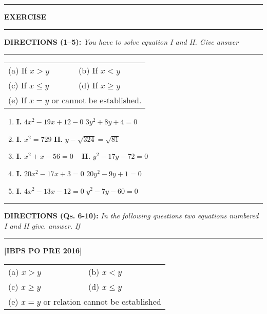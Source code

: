 \begin{multicols}{2}

\noindent
\rule{\columnwidth}{1pt}

\centerline{{\large\sf\bfseries EXERCISE}}

\noindent
\rule{\columnwidth}{1pt}

\noindent
{\sf\bfseries DIRECTIONS (1--5):} {\it You have to solve equation I and II. Give answer}

\noindent
\rule{\columnwidth}{1pt}

\begin{tabular}{l@{\qquad\quad}l}
(a) If $x > y$ & (b) If $x < y$\\ 
(c) If $x \leq y$ & (d) If $x \geq y$\\ 
\multicolumn{2}{l}{(e) If $x = y$ or cannot be established.}
\end{tabular}

\begin{enumerate}[leftmargin=*]
\item {\bf I.} $4x^2 - 19x + 12 - 0$   $3y^2 + 8y + 4 = 0$

\item {\bf I.} $x^2 = 729$  \hspace{2.25cm} {\bf II.} $y - \sqrt{324} = \sqrt{81}$

\item {\bf I.} $x^2 + x - 56 = 0$  \qquad\quad~ {\bf II.} $y^2 - 17y - 72 = 0$

\item {\bf I.} $20x^2 - 17x + 3 = 0$   $20y^2 - 9y + 1 = 0$

\item {\bf I.} $4x^2 - 13x - 12 = 0$   $y^2 - 7y - 60 = 0$

\end{enumerate}


\noindent
\rule{\columnwidth}{1pt}

\noindent
{\sf\bfseries DIRECTIONS (Qs. 6-10):} {\it In the following questions two equations numbered I and II give. answer. If}

\noindent
\rule{\columnwidth}{1pt}

\hfill{\bf [IBPS PO PRE 2016]}


\begin{tabular}{l@{\qquad\quad}l}
(a) $x > y$ & (b) $x < y$\\ 
(c) $x \geq y$ & (d) $x \leq y$\\ 
\multicolumn{2}{l}{(e) $x = y$ or relation cannot be established}
\end{tabular}


\end{multicols}
